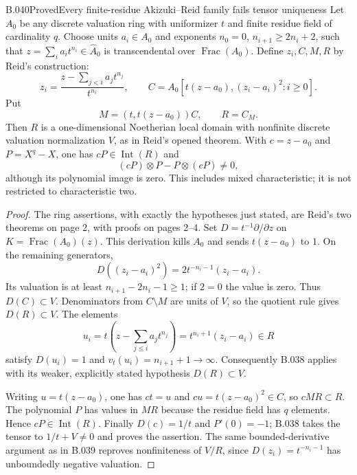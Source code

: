 \begin{saresult}{B.040}{Proved}{Every finite-residue Akizuki--Reid family fails tensor uniqueness}
Let $A_0$ be any discrete valuation ring with uniformizer $t$ and
finite residue field of cardinality $q$. Choose units $a_i\in A_0$
and exponents $n_0=0$, $n_{i+1}\ge2n_i+2$, such that
$z=\sum_i a_it^{n_i}\in\widehat A_0$ is transcendental over
$\operatorname{Frac}(A_0)$. Define $z_i,C,M,R$ by Reid's construction:
\[
 z_i=\frac{z-\sum_{j<i}a_jt^{n_j}}{t^{n_i}},\qquad
 C=A_0[t(z-a_0),(z_i-a_i)^2:i\ge0].
\]
Put
\[
 M=(t,t(z-a_0))C,\qquad R=C_M.
\]
Then $R$ is a one-dimensional Noetherian local domain with
nonfinite discrete valuation normalization $V$, as in Reid's
opened theorem. With $c=z-a_0$ and $P=X^q-X$, one has
$cP\in\operatorname{Int}(R)$ and
\[
 (cP)\otimes P-P\otimes(cP)\ne0,
\]
although its polynomial image is zero. This includes mixed
characteristic; it is not restricted to characteristic two.
\end{saresult}
\begin{proof}
The ring assertions, with exactly the hypotheses just stated,
are Reid's two theorems on page 2, with proofs on pages 2--4.
Set $D=t^{-1}\partial/\partial z$ on
$K=\operatorname{Frac}(A_0)(z)$. This derivation kills $A_0$
and sends $t(z-a_0)$ to $1$. On the remaining generators,
\[
 D((z_i-a_i)^2)=2t^{-n_i-1}(z_i-a_i).
\]
Its valuation is at least
$n_{i+1}-2n_i-1\ge1$; if $2=0$ the value is zero.
Thus $D(C)\subset V$. Denominators from $C\setminus M$ are
units of $V$, so the quotient rule gives $D(R)\subset V$.
The elements
\[
 u_i=t\left(z-\sum_{j\le i}a_jt^{n_j}\right)
      =t^{n_i+1}(z_i-a_i)\in R
\]
satisfy $D(u_i)=1$ and $v_t(u_i)=n_{i+1}+1\to\infty$.
Consequently B.038 applies with its weaker, explicitly stated
hypothesis $D(R)\subset V$.

Writing $u=t(z-a_0)$, one has $ct=u$ and
$cu=t(z-a_0)^2\in C$, so $cMR\subset R$.
The polynomial $P$ has values in $MR$ because the residue field
has $q$ elements. Hence $cP\in\operatorname{Int}(R)$.
Finally $D(c)=1/t$ and $P'(0)=-1$; B.038 takes the tensor to
$1/t+V\ne0$ and proves the assertion.
The same bounded-derivative argument as in B.039 reproves
nonfiniteness of $V/R$, since $D(z_i)=t^{-n_i-1}$ has
unboundedly negative valuation.
\end{proof}


